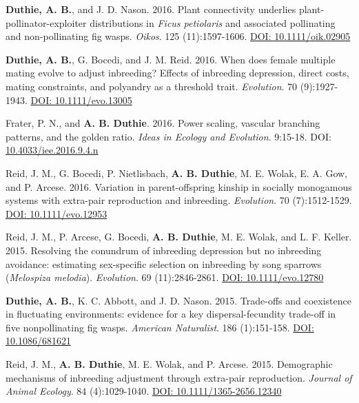 \documentclass[letterpaper]{article}
\begin{document}
\begin{etaremune}
\item {\bf Duthie, A. B.}, and J. D. Nason. 2016. Plant connectivity underlies plant-pollinator-exploiter distributions in {\it Ficus petiolaris} and associated pollinating and non-pollinating fig wasps. {\it Oikos}. 125 (11):1597-1606. \href{http://onlinelibrary.wiley.com/doi/10.1111/oik.02905/abstract}{DOI: 10.1111/oik.02905}
\item {\bf Duthie, A. B.}, G. Bocedi, and J. M. Reid. 2016. When does female multiple mating evolve to adjust inbreeding? Effects of inbreeding depression, direct costs, mating constraints, and polyandry as a threshold trait. {\it Evolution}. 70 (9):1927-1943. \href{http://onlinelibrary.wiley.com/doi/10.1111/evo.13005/abstract}{DOI: 10.1111/evo.13005}
\item Frater, P. N., and {\bf A. B. Duthie}. 2016. Power scaling, vascular branching patterns, and the golden ratio. {\it Ideas in Ecology and Evolution}. 9:15-18. DOI: \href{http://ojs.library.queensu.ca/index.php/IEE/article/view/6312}{10.4033/iee.2016.9.4.n}
\item Reid, J. M., G. Bocedi, P. Nietlisbach, {\bf A. B. Duthie}, M. E. Wolak, E. A. Gow, and P. Arcese. 2016. Variation in parent-offspring kinship in socially monogamous systems with extra-pair reproduction and inbreeding. {\it Evolution}. 70 (7):1512-1529. \href{http://onlinelibrary.wiley.com/doi/10.1111/evo.12953/abstract}{DOI: 10.1111/evo.12953}
\item Reid, J. M., P. Arcese, G. Bocedi, {\bf A. B. Duthie}, M. E. Wolak, and L. F. Keller. 2015. Resolving the conundrum of inbreeding depression but no inbreeding avoidance: estimating sex-specific selection on inbreeding by song sparrows ({\it Melospiza melodia}). {\it Evolution}. 69 (11):2846-2861. \href{http://onlinelibrary.wiley.com/doi/10.1111/evo.12780/abstract}{DOI: 10.1111/evo.12780}
\item {\bf Duthie, A. B.}, K. C. Abbott, and J. D. Nason. 2015. Trade-offs and coexistence in fluctuating environments: evidence for a key dispersal-fecundity trade-off in five nonpollinating fig wasps. {\it American Naturalist}. 186 (1):151-158. \href{http://www.jstor.org/stable/10.1086/681621}{DOI: 10.1086/681621}
\item Reid, J. M., {\bf A. B. Duthie}, M. E. Wolak, and P. Arcese. 2015. Demographic mechanisms of inbreeding adjustment through extra-pair reproduction. {\it Journal of Animal Ecology}. 84 (4):1029-1040. \href{http://onlinelibrary.wiley.com/doi/10.1111/1365-2656.12340/abstract}{DOI: 10.1111/1365-2656.12340}

\end{etaremune}
\end{document}
